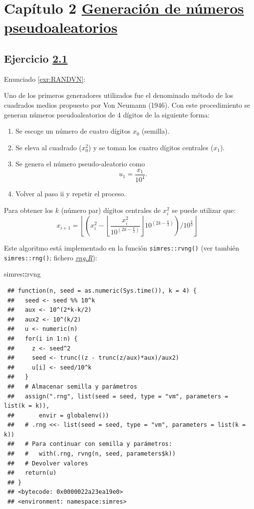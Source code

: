 \documentclass[
  spanish,
  10pt,
]{book}
\newenvironment{Shaded}{\begin{snugshade}}{\end{snugshade}}
\newcommand{\NormalTok}[1]{#1}
\newcommand{\SpecialCharTok}[1]{\textcolor[rgb]{0.81,0.36,0.00}{\textbf{#1}}}
\theoremstyle{break}
\theoremstyle{nonumberplain}
\begin{document}
\section{\texorpdfstring{Capítulo 2 \href{gen-pseudo.html}{Generación de números pseudoaleatorios}}{Capítulo 2 Generación de números pseudoaleatorios}}\label{capuxedtulo-2-generaciuxf3n-de-nuxfameros-pseudoaleatorios}

\subsection{\texorpdfstring{Ejercicio \href{ejercicios.html\#exr:RANDVN}{2.1}}{Ejercicio 2.1}}\label{sol-RANDVN}

Enunciado \ref{exr:RANDVN}:

Uno de los primeros generadores utilizados fue el denominado método de los
cuadrados medios propuesto por Von Neumann (1946). Con este
procedimiento se generan números pseudoaleatorios de 4 dígitos de la
siguiente forma:

\begin{enumerate}
\def\labelenumi{\roman{enumi}.}
\item
  Se escoge un número de cuatro dígitos \(x_0\) (semilla).
\item
  Se eleva al cuadrado (\(x_0^2\)) y se toman los cuatro dígitos centrales (\(x_1\)).
\item
  Se genera el número pseudo-aleatorio como \[u_1=\frac{x_1}{10^{4}}.\]
\item
  Volver al paso ii y repetir el proceso.
\end{enumerate}

Para obtener los \(k\) (número par) dígitos centrales de \(x_{i}^2\)
se puede utilizar que:
\[x_{i+1}=\left\lfloor \left(  x_{i}^2-\left\lfloor \dfrac{x_{i}^2}{10^{(2k-\frac{k}2)}}\right\rfloor 10^{(2k-\frac{k}2)}\right)
/10^{\frac{k}2}\right\rfloor\]

Este algoritmo está implementado en la función \texttt{simres::rvng()} (ver también \texttt{simres::rng()}; fichero \href{R/rng.R}{\emph{rng.R}}):

\begin{Shaded}
\begin{Highlighting}[]
\NormalTok{simres}\SpecialCharTok{::}\NormalTok{rvng}
\end{Highlighting}
\end{Shaded}

\begin{verbatim}
 ## function(n, seed = as.numeric(Sys.time()), k = 4) {
 ##   seed <- seed %% 10^k
 ##   aux <- 10^(2*k-k/2)
 ##   aux2 <- 10^(k/2)
 ##   u <- numeric(n)
 ##   for(i in 1:n) {
 ##     z <- seed^2
 ##     seed <- trunc((z - trunc(z/aux)*aux)/aux2)
 ##     u[i] <- seed/10^k
 ##   }
 ##   # Almacenar semilla y parámetros
 ##   assign(".rng", list(seed = seed, type = "vm", parameters = list(k = k)),
 ##       envir = globalenv())
 ##   # .rng <<- list(seed = seed, type = "vm", parameters = list(k = k))
 ##   # Para continuar con semilla y parámetros:
 ##   #   with(.rng, rvng(n, seed, parameters$k))
 ##   # Devolver valores
 ##   return(u)
 ## }
 ## <bytecode: 0x0000022a23ea19e0>
 ## <environment: namespace:simres>
\end{verbatim}
\end{document}

